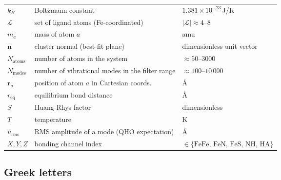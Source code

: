\documentclass[11pt,a4paper,twoside]{article}
\providecommand{\angstrom}{\text{\AA}}    %
\theoremstyle{remark}
\begin{document}
\begin{tabular}{p{1.5cm} p{6cm} p{4cm}}
  $k_B$           & Boltzmann constant & $1.381 \times 10^{-23}$\,J/K \\
  $\mathcal{L}$   & set of ligand atoms (Fe-coordinated) & $|\mathcal{L}| \approx 4$--$8$ \\
  $m_a$           & mass of atom $a$ & amu \\
  $\mathbf{n}$    & cluster normal (best-fit plane) & dimensionless unit vector \\
  $N_\text{atoms}$ & number of atoms in the system & $\approx 50$--$3000$ \\
  $N_\text{modes}$ & number of vibrational modes in the filter range & $\approx 100$--$10\,000$ \\
  $\mathbf{r}_a$  & position of atom $a$ in Cartesian coords. & $\angstrom$ \\
  $r_\text{eq}$   & equilibrium bond distance & $\angstrom$ \\
  $S$             & Huang-Rhys factor & dimensionless \\
  $T$             & temperature & K \\
  $u_\text{rms}$  & RMS amplitude of a mode (QHO expectation) & $\angstrom$ \\
  $X, Y, Z$       & bonding channel index & $\in \{\text{FeFe, FeN, FeS, NH, HA}\}$ \\
  \bottomrule
\end{tabular}

\subsection{Greek letters}
\end{document}
